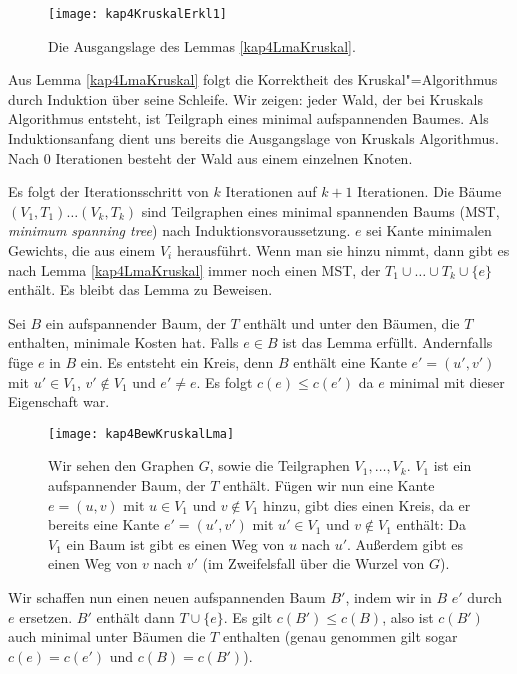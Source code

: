\begin{figure}[htb]
  \centering
  \texttt{[image: kap4KruskalErkl1]}
  \caption{Die Ausgangslage des Lemmas \vref{kap4LmaKruskal}.}
  \label{KruskalErkl1}
\end{figure}

Aus Lemma \vref{kap4LmaKruskal} folgt die Korrektheit des Kruskal"=Algorithmus durch Induktion über seine Schleife.
Wir zeigen: jeder Wald, der bei Kruskals Algorithmus entsteht, ist Teilgraph eines minimal aufspannenden Baumes. Als Induktionsanfang dient uns bereits die Ausgangslage von Kruskals Algorithmus. Nach $0$ Iterationen besteht der Wald aus einem einzelnen Knoten.

Es folgt der Iterationsschritt von $k$ Iterationen auf $k+1$ Iterationen. Die Bäume $(V_1, T_1) \ldots (V_k, T_k)$ sind Teilgraphen eines minimal spannenden Baums (MST, \textit{minimum spanning tree}) nach Induktionsvoraussetzung. $e$ sei Kante minimalen Gewichts, die aus einem $V_i$ herausführt. Wenn man sie hinzu nimmt, dann gibt es nach Lemma \ref{kap4LmaKruskal} immer noch einen MST, der $T_1 \cup \ldots \cup T_k \cup \{e\}$ enthält. Es bleibt das Lemma zu Beweisen.

\begin{Bew}
  \hspace{\parindent}Sei $B$ ein aufspannender Baum, der $T$ enthält und unter den Bäumen, die $T$ enthalten, minimale Kosten hat. Falls $e \in B$ ist das Lemma erfüllt. Andernfalls füge $e$ in $B$ ein. Es entsteht ein Kreis, denn $B$ enthält eine Kante $e' = (u', v')$ mit $u' \in V_1$, $v' \notin V_1$ und $e' \neq e$.  Es folgt $c(e) \le c(e')$ da $e$ minimal mit dieser Eigenschaft war.
  
  \begin{figure}[htb]
    \centering
    \texttt{[image: kap4BewKruskalLma]}
    \caption{Wir sehen den Graphen $G$, sowie die Teilgraphen $V_1, \ldots, V_k$. $V_1$ ist ein aufspannender Baum, der $T$ enthält. Fügen wir nun eine Kante $e=(u,v)$ mit $u \in V_1$ und $v \notin V_1$ hinzu, gibt dies einen Kreis, da er bereits eine Kante $e'=(u', v')$ mit $u' \in V_1$ und $v \notin V_1$ enthält: Da $V_1$ ein Baum ist gibt es einen Weg von $u$ nach $u'$. Außerdem gibt es einen Weg von $v$ nach $v'$ (im Zweifelsfall über die Wurzel von $G$).}
  \end{figure}
  
  Wir schaffen nun einen neuen aufspannenden Baum $B'$, indem wir in $B$ $e'$ durch $e$ ersetzen. $B'$ enthält dann $T \cup \{e\}$. Es gilt $c(B') \le c(B)$, also ist $c(B')$ auch minimal unter Bäumen die $T$ enthalten (genau genommen gilt sogar $c(e) = c(e')$ und $c(B) = c(B')$).
\end{Bew}


